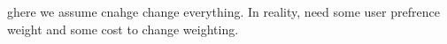 ghere we assume cnahge change everything. In reality, need some user prefrence weight and some cost to change weighting.